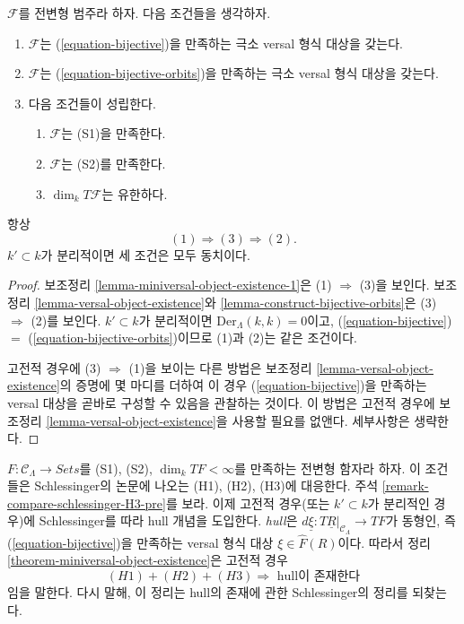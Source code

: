 \begin{theorem}
\label{theorem-miniversal-object-existence}
$\mathcal{F}$를 전변형 범주라 하자. 다음 조건들을 생각하자.
\begin{enumerate}
\item $\mathcal{F}$는 (\ref{equation-bijective})을 만족하는
극소 versal 형식 대상을 갖는다.
\item $\mathcal{F}$는 (\ref{equation-bijective-orbits})을 만족하는
극소 versal 형식 대상을 갖는다.
\item 다음 조건들이 성립한다.
\begin{enumerate}
\item $\mathcal{F}$는 (S1)을 만족한다.
\item $\mathcal{F}$는 (S2)를 만족한다.
\item $\dim_k T\mathcal{F}$는 유한하다.
\end{enumerate}
\end{enumerate}
항상
$$
(1) \Rightarrow (3) \Rightarrow (2).
$$
$k' \subset k$가 분리적이면 세 조건은 모두 동치이다.
\end{theorem}

\begin{proof}
보조정리 \ref{lemma-miniversal-object-existence-1}은
(1) $\Rightarrow$ (3)을 보인다.
보조정리 \ref{lemma-versal-object-existence}와
\ref{lemma-construct-bijective-orbits}은
(3) $\Rightarrow$ (2)를 보인다.
$k' \subset k$가 분리적이면
$\text{Der}_\Lambda(k, k) = 0$이고,
(\ref{equation-bijective}) $=$ (\ref{equation-bijective-orbits})이므로
(1)과 (2)는 같은 조건이다.

\medskip\noindent
고전적 경우에 (3) $\Rightarrow$ (1)을 보이는 다른 방법은
보조정리 \ref{lemma-versal-object-existence}의 증명에 몇 마디를 더하여
이 경우 (\ref{equation-bijective})을 만족하는 versal 대상을
곧바로 구성할 수 있음을 관찰하는 것이다.
이 방법은 고전적 경우에 보조정리
\ref{lemma-versal-object-existence}을 사용할 필요를 없앤다.
세부사항은 생략한다.
\end{proof}

\begin{remark}
\label{remark-compare-schlessinger-H3}
$F : \mathcal{C}_\Lambda \to \textit{Sets}$를
(S1), (S2), $\dim_k TF < \infty$를 만족하는 전변형 함자라 하자.
이 조건들은 Schlessinger의 논문에 나오는 (H1), (H2), (H3)에
대응한다. 주석 \ref{remark-compare-schlessinger-H3-pre}를 보라.
이제 고전적 경우(또는 $k' \subset k$가 분리적인 경우)에
Schlessinger를 따라 hull 개념을 도입한다.
{\it hull}은
$d\underline{\xi} : T\underline{R}|_{\mathcal{C}_\Lambda} \to TF$가
동형인, 즉 (\ref{equation-bijective})을 만족하는
versal 형식 대상 $\xi \in \widehat{F}(R)$이다.
따라서 정리 \ref{theorem-miniversal-object-existence}은
고전적 경우
$$
(H1) + (H2) + (H3)
\Rightarrow
\text{ hull이 존재한다}
$$
임을 말한다. 다시 말해, 이 정리는 hull의 존재에 관한
Schlessinger의 정리를 되찾는다.
\end{remark}

